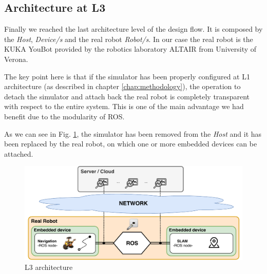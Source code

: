 \subsection{Architecture at L3}
Finally we reached the last architecture level of the design flow. It is composed by the \textit{Host}, \textit{Device/s } and the real robot \textit{Robot/s}. In our case the real robot is the KUKA YouBot \cite{YouBot} provided by the robotics laboratory ALTAIR  from University of Verona.

The key point here is that if the simulator has been properly configured at L1 architecture (as described in chapter \ref{chap:methodology}),  the operation to detach the simulator and attach back the real robot is completely transparent with respect to the entire system. This is one of the main advantage we had benefit due to the modularity of ROS.

As we can see in Fig. \ref{fig:l3archexp}, the simulator has been removed from the \textit{Host} and it has been replaced by the real robot, on which one or more embedded devices can be attached.

\begin{figure}[tbp]
	\centering
	\includegraphics[width=\textwidth]{images/L3-arch-exp}
	\caption{L3 architecture}
	\label{fig:l3archexp}
\end{figure}


